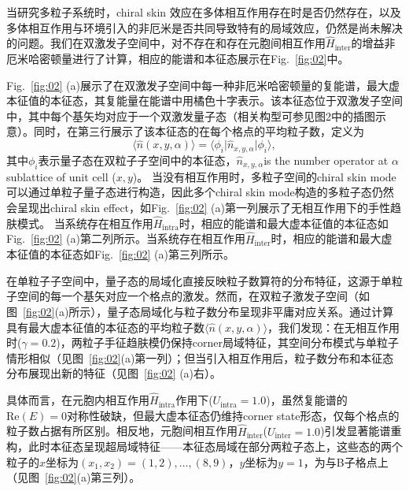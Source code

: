 \documentclass[longbibliography, aps, prx, amsmath, amssymb, amsfonts, twocolumn,superscriptaddress, footinbib]{revtex4-1}
\begin{document}

	当研究多粒子系统时，chiral skin 效应在多体相互作用存在时是否仍然存在，以及多体相互作用与环境引入的非厄米是否共同导致特有的局域效应，仍然是尚未解决的问题。我们在双激发子空间中，对不存在和存在元胞间相互作用$\hat{H}_{\text{inter}}$的增益非厄米哈密顿量进行了计算，相应的能谱和本征态展示在Fig.~\ref{fig:02}中。
	
	Fig.~\ref{fig:02} (a)展示了在双激发子空间中每一种非厄米哈密顿量的复能谱，最大虚本征值的本征态，其复能量在能谱中用橘色十字表示。该本征态位于双激发子空间中，其中每个基矢均对应于一个双激发量子态（相关构型可参见图2中的插图示意）。同时，在第三行展示了该本征态的在每个格点的平均粒子数，定义为
	\begin{equation}
		\langle \hat{n}(x,y,\alpha) \rangle = \langle \phi_i \vert \hat{n}_{x,y,\alpha} \vert \phi_i \rangle,
	\end{equation}
	其中$\phi_i$表示量子态在双粒子子空间中的本征态，$\hat{n}_{x,y,\alpha}$is the number operator at $\alpha$ sublattice of unit cell (${x},{y}$)。
	当没有相互作用时，多粒子空间的chiral skin mode可以通过单粒子量子态进行构造，因此多个chiral skin mode构造的多粒子态仍然会呈现出chiral skin effect，如Fig.~\ref{fig:02} (a)第一列展示了无相互作用下的手性趋肤模式。
	当系统存在相互作用$\hat{H}_{\text{intra}}$时，相应的能谱和最大虚本征值的本征态如Fig.~\ref{fig:02} (a)第二列所示。当系统存在相互作用$\hat{H}_{\text{inter}}$时，相应的能谱和最大虚本征值的本征态如Fig.~\ref{fig:02} (a)第三列所示。


	在单粒子子空间中，量子态的局域化直接反映粒子数算符的分布特征，这源于单粒子空间的每一个基矢对应一个格点的激发。然而，在双粒子激发子空间（如图~\ref{fig:02}(a)所示），量子态局域化与粒子数分布呈现非平庸对应关系。通过计算具有最大虚本征值的本征态的平均粒子数$\langle \hat{n}(x,y,\alpha) \rangle$，我们发现：在无相互作用时($\gamma=0.2$)，两粒子手征趋肤模仍保持corner局域特征，其空间分布模式与单粒子情形相似（见图~\ref{fig:02}(a)第一列）；但当引入相互作用后，粒子数分布和本征态分布展现出新的特征（见图~\ref{fig:02} (a)右）。


	具体而言，在元胞内相互作用$\hat{H}_{\text{intra}}$作用下($U_{\text{intra}}=1.0$)，虽然复能谱的$\mathrm{Re}(E)=0$对称性破缺，但最大虚本征态仍维持corner state形态，仅每个格点的粒子数占据有所区别。相反地，元胞间相互作用$\hat{H}_{\text{inter}}$($U_{\text{inter}}=1.0$)引发显著能谱重构，此时本征态呈现超局域特征——本征态局域在部分两粒子态上，这些态的两个粒子的$x$坐标为$(x_1,x_2)=(1,2),...,(8,9)$，$y$坐标为$y=1$，为与B子格点上（见图~\ref{fig:02}(a)第三列）。
\end{document}
